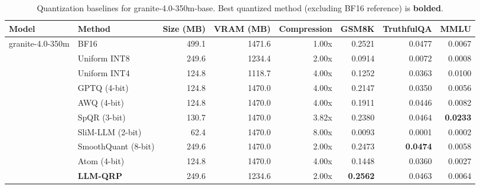 \documentclass{article}
\begin{document}
\begin{table}[htbp]
  \centering
  \small
  \caption{Quantization baselines for granite-4.0-350m-base. Best quantized method (excluding BF16 reference) is \textbf{bolded}.}
  \label{tab:bench_granite_4.0_350m_base}
  \begin{tabular}{llrrrrrr}
    \toprule
    \textbf{Model} & \textbf{Method} & \textbf{Size (MB)} & \textbf{VRAM (MB)} & \textbf{Compression} & \textbf{GSM8K} & \textbf{TruthfulQA} & \textbf{MMLU} \\
    \midrule
    \multirow{10}{*}{granite-4.0-350m}
     & BF16 & 499.1 & 1471.6 & 1.00x & 0.2521 & 0.0477 & 0.0067 \\
     & Uniform INT8 & 249.6 & 1234.4 & 2.00x & 0.0914 & 0.0072 & 0.0008 \\
     & Uniform INT4 & 124.8 & 1118.7 & 4.00x & 0.1252 & 0.0363 & 0.0100 \\
     & GPTQ (4-bit) & 124.8 & 1470.0 & 4.00x & 0.2147 & 0.0350 & 0.0056 \\
     & AWQ (4-bit) & 124.8 & 1470.0 & 4.00x & 0.1911 & 0.0446 & 0.0082 \\
     & SpQR (3-bit) & 130.7 & 1470.0 & 3.82x & 0.2380 & 0.0464 & \textbf{0.0233} \\
     & SliM-LLM (2-bit) & 62.4 & 1470.0 & 8.00x & 0.0093 & 0.0001 & 0.0002 \\
     & SmoothQuant (8-bit) & 249.6 & 1470.0 & 2.00x & 0.2473 & \textbf{0.0474} & 0.0058 \\
     & Atom (4-bit) & 124.8 & 1470.0 & 4.00x & 0.1448 & 0.0360 & 0.0027 \\
     & \textbf{LLM-QRP} & 249.6 & 1234.6 & 2.00x & \textbf{0.2562} & 0.0463 & 0.0064 \\
    \bottomrule
  \end{tabular}
\end{table}
\end{document}
